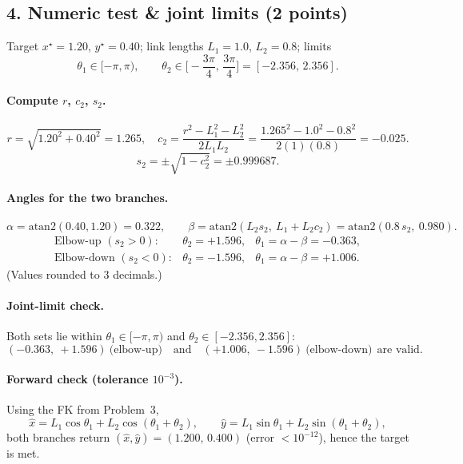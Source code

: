 \documentclass[11pt]{article}
\begin{document}
\subsection*{4. Numeric test \& joint limits (2 points)}
Target $x^\star=1.20$, $y^\star=0.40$; link lengths $L_1=1.0$, $L_2=0.8$; limits
\[
\theta_1\in[-\pi,\pi),\qquad \theta_2\in\Big[-\frac{3\pi}{4},\,\frac{3\pi}{4}\Big]=[-2.356,\,2.356].
\]

\paragraph{Compute $r$, $c_2$, $s_2$.}
\[
r=\sqrt{1.20^2+0.40^2}=1.265,\quad
c_2=\frac{r^2-L_1^2-L_2^2}{2L_1L_2}=\frac{1.265^2-1.0^2-0.8^2}{2(1)(0.8)}=-0.025.
\]
\[
s_2=\pm\sqrt{1-c_2^2}=\pm 0.999687.
\]

\paragraph{Angles for the two branches.}
\[
\alpha=\mathrm{atan2}(0.40,1.20)=0.322,\qquad
\beta=\mathrm{atan2}(L_2 s_2,\ L_1+L_2 c_2)=\mathrm{atan2}(0.8\,s_2,\ 0.980).
\]
\[
\begin{array}{lcl}
\text{Elbow-up }(s_2>0): & \theta_2=+1.596, & \theta_1=\alpha-\beta=-0.363,\\[2pt]
\text{Elbow-down }(s_2<0): & \theta_2=-1.596, & \theta_1=\alpha-\beta=+1.006.
\end{array}
\]
(Values rounded to 3 decimals.)

\paragraph{Joint-limit check.}
Both sets lie within $\theta_1\in[-\pi,\pi)$ and $\theta_2\in[-2.356,2.356]$:
\[
\boxed{(-0.363,\ +1.596)}\ \text{(elbow-up)}\quad\text{and}\quad
\boxed{(+1.006,\ -1.596)}\ \text{(elbow-down)}\ \ \text{are valid.}
\]

\paragraph{Forward check (tolerance $10^{-3}$).}
Using the FK from Problem~3,
\[
\hat x=L_1\cos\theta_1+L_2\cos(\theta_1+\theta_2),\qquad
\hat y=L_1\sin\theta_1+L_2\sin(\theta_1+\theta_2),
\]
both branches return $(\hat x,\hat y)=(1.200,\,0.400)$ (error $<10^{-12}$), hence the target is met.
\end{document}
